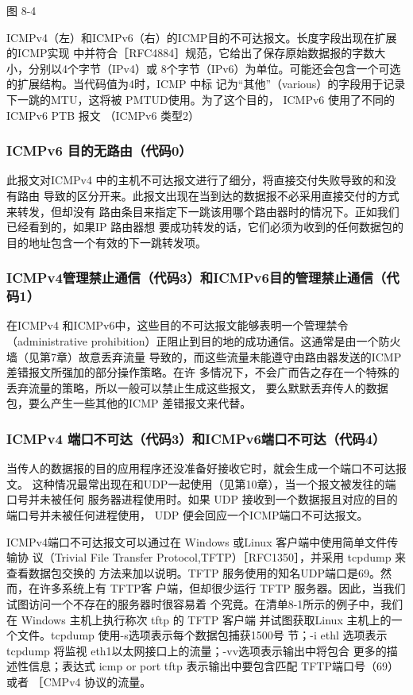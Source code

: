 图 8-4

ICMPv4（左）和ICMPv6（右）的ICMP目的不可达报文。长度字段出现在扩展的ICMP实现
中并符合［RFC4884］规范，它给出了保存原始数据报的字数大小，分别以4个字节（IPv4）或
8个字节（IPv6）为单位。可能还会包含一个可选的扩展结构。当代码值为4时，ICMP 中标
记为“其他”（various）的字段用于记录下一跳的MTU，这将被 PMTUD使用。为了这个目的，
ICMPv6 使用了不同的ICMPv6 PTB 报文 （ICMPv6 类型2）

\subsubsection{ICMPv6 目的无路由（代码0）}
此报文对ICMPv4 中的主机不可达报文进行了细分，将直接交付失败导致的和没有路由
导致的区分开来。此报文出现在当到达的数据报不必采用直接交付的方式来转发，但却没有
路由条目来指定下一跳该用哪个路由器时的情况下。正如我们已经看到的，如果IP 路由器想
要成功转发的话，它们必须为收到的任何数据包的目的地址包含一个有效的下一跳转发项。

\subsubsection{ICMPv4管理禁止通信（代码3）和ICMPv6目的管理禁止通信（代码1）}
在ICMPv4 和ICMPv6中，这些目的不可达报文能够表明一个管理禁令（administrative
prohibition）正阻止到目的地的成功通信。这通常是由一个防火墙（见第7章）故意丢弃流量
导致的，而这些流量未能遵守由路由器发送的ICMP差错报文所强加的部分操作策略。在许
多情况下，不会广而告之存在一个特殊的丢弃流量的策略，所以一般可以禁止生成这些报文，
要么默默丢弃传人的数据包，要么产生一些其他的ICMP 差错报文来代替。

\subsubsection{ICMPv4 端口不可达（代码3）和ICMPv6端口不可达（代码4）}
当传人的数据报的目的应用程序还没准备好接收它时，就会生成一个端口不可达报文。
这种情况最常出现在和UDP一起使用（见第10章），当一个报文被发往的端口号并未被任何
服务器进程使用时。如果 UDP 接收到一个数据报且对应的目的端口号并未被任何进程使用，
UDP 便会回应一个ICMP端口不可达报文。

ICMPv4端口不可达报文可以通过在 Windows 或Linux 客户端中使用简单文件传输协
议（Trivial File Transfer Protocol,TFTP）［RFC1350］，并采用 tcpdump 来查看数据包交换的
方法来加以说明。TFTP 服务使用的知名UDP端口是69。然而，在许多系统上有 TFTP客
户端，但却很少运行 TFTP 服务器。因此，当我们试图访问一个不存在的服务器时很容易着
个究竟。在清单8-1所示的例子中，我们在 Windows 主机上执行称次 tftp 的 TFTP 客户端
并试图获取Linux 主机上的一个文件。tcpdump 使用-s选项表示每个数据包捕获1500号
节；-i ethl 选项表示 tcpdump 将监视 eth1以太网接口上的流量；-vv选项表示输出中将包合
更多的描述性信息；表达式 icmp or port tftp 表示输出中要包含匹配 TFTP端口号（69）或者
［CMPv4 协议的流量。

